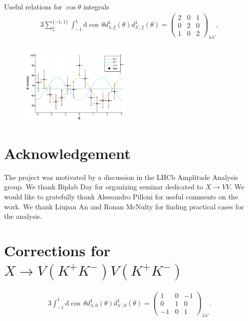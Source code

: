 \documentclass[prd,preprintnumbers,floatfix,
nofootinbib,superscriptaddress]{revtex4}
\newcommand{\diff}{\mathrm{d}}
\begin{document}
Useful relations for $\cos\theta$ integrals
\begin{align}
  3 \sum_{\xi}^{\{-1,1\}} \int_{-1}^{1} \diff \cos\,\theta d_{\lambda,\xi}^{1}(\theta) d_{\lambda',\xi}^{1}(\theta) =
  \begin{pmatrix}2 & 0 & 1\\0 & 2 & 0\\1 & 0 & 2\end{pmatrix}_{\lambda\lambda'},\\
\end{align}

\begin{figure}
  \includegraphics[width=0.48\textwidth]{../plots/phi_higgs.pdf}
  \caption{}
  \label{}
\end{figure}

\section*{Acknowledgement}
The project was motivated by a discussion in the LHCb Amplitude Analysis group.
We thank Biplab Day for organizing seminar dedicated to $X\to VV$.
We would like to gratefully thank Alessandro Pilloni for useful comments on the work.
We thank Liupan An and Ronan McNulty for finding practical cases for the analysis.

\appendix

\section{Corrections for $X\to V(K^+K^-)V(K^+K^-)$}
\begin{align}
  3 \int_{-1}^{1} \diff \cos\,\theta d_{\lambda,0}^{1}(\theta) d_{\lambda',0}^{1}(\theta) =
  \begin{pmatrix}1 & 0 & -1\\0 & 1 & 0\\-1 & 0 & 1\end{pmatrix}_{\lambda\lambda'}.
\end{align}
\end{document}
